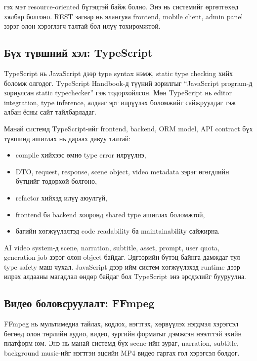 гэх мэт resource-oriented бүтэцтэй байж болно. Энэ нь системийг өргөтгөхөд хялбар болгоно. REST загвар нь ялангуяа frontend, mobile client, admin panel зэрэг олон хэрэглэгч талтай бол илүү тохиромжтой.

\subsection{Бүх түвшний хэл: TypeScript}

TypeScript нь JavaScript дээр type syntax нэмж, static type checking хийх боломж олгодог. TypeScript Handbook-д түүний зорилгыг ``JavaScript program-д зориулсан static typechecker'' гэж тодорхойлсон. Мөн TypeScript нь editor integration, type inference, алдааг эрт илрүүлэх боломжийг сайжруулдаг гэж албан ёсны сайт тайлбарладаг.

Манай системд TypeScript-ийг frontend, backend, ORM model, API contract бүх түвшинд ашиглах нь дараах давуу талтай:

\begin{itemize}
\item compile хийхээс өмнө type error илрүүлнэ,
\item DTO, request, response, scene object, video metadata зэрэг өгөгдлийн бүтцийг тодорхой болгоно,
\item refactor хийхэд илүү аюулгүй,
\item frontend ба backend хооронд shared type ашиглах боломжтой,
\item багийн хөгжүүлэлтэд code readability ба maintainability сайжирна.
\end{itemize}

AI video system-д scene, narration, subtitle, asset, prompt, user quota, generation job зэрэг олон object байдаг. Эдгээрийн бүтэц байнга дамждаг тул type safety маш чухал. JavaScript дээр ийм систем хөгжүүлэхэд runtime дээр илрэх алдааны магадлал өндөр байдаг бол TypeScript энэ эрсдэлийг бууруулна.

\subsection{Видео боловсруулалт: FFmpeg}

FFmpeg нь мультимедиа тайлах, кодлох, нэгтгэх, хөрвүүлэх нэгдмэл хэрэгсэл бөгөөд олон төрлийн аудио, видео, зургийн форматыг дэмжсэн нээлттэй эхийн платформ юм. Энэ нь манай системд бүх scene-ийн зураг, narration, subtitle, background music-ийг нэгтгэн эцсийн MP4 видео гаргах гол хэрэгсэл болдог.

